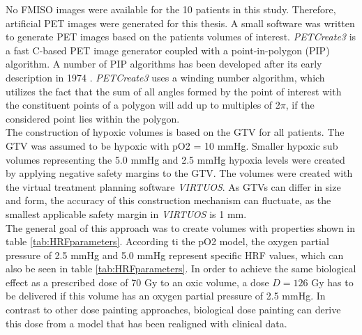 No FMISO images were available for the 10 patients in this study. Therefore, artificial PET images were generated for this thesis. A small software was written to generate PET images based on the patients volumes of interest. \textit{PETCreate3} is a fast C-based PET image generator coupled with a point-in-polygon (PIP) algorithm. A number of PIP algorithms has been developed after its early description in 1974 \cite{Sutherland}. \textit{PETCreate3} uses a winding number algorithm, which utilizes the fact that the sum of all angles formed by the point of interest with the constituent points of a polygon will add up to multiples of 2$\pi$, if the considered point lies within the polygon.\\The construction of hypoxic volumes is based on the GTV for all patients. The GTV was assumed to be hypoxic with  pO2 = 10 mmHg. Smaller hypoxic sub volumes representing the 5.0 mmHg and 2.5 mmHg hypoxia levels were created by applying negative safety margins to the GTV. The volumes were created with the virtual treatment planning software \textit{VIRTUOS}. As GTVs can differ in size and form, the accuracy of this construction mechanism can fluctuate, as the smallest applicable safety margin in \textit{VIRTUOS} is 1 mm.\\The general goal of this approach was to create volumes with properties shown in table \ref{tab:HRFparameters}. According ti the pO2 model, the oxygen partial pressure of 2.5 mmHg and 5.0 mmHg represent specific HRF values, which can also be seen in table \ref{tab:HRFparameters}. In order to achieve the same biological effect as a prescribed dose of 70 Gy to an oxic volume, a dose $D = 126$ Gy has to be delivered if this volume has an oxygen partial pressure of 2.5 mmHg. In contrast to other dose painting approaches, biological dose painting can derive this dose from a model that has been realigned with clinical data.
